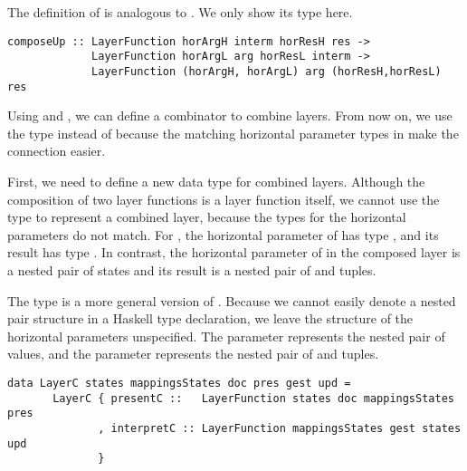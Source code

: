 \documentclass[preprint,natbib]{sigplanconf}
\begin{document}



The definition of  is analogous to . We only show its type here.

\begin{small}
\begin{verbatim}
composeUp :: LayerFunction horArgH interm horResH res ->
             LayerFunction horArgL arg horResL interm ->
             LayerFunction (horArgH, horArgL) arg (horResH,horResL) res
\end{verbatim}
\end{small}


Using  and , we can define a combinator to combine  layers. 
\bc From now on, we use the type  instead of  because the matching horizontal parameter types in  make the connection easier. \ec


First, we need to define a new data type for combined layers. Although the composition of two layer functions is a layer function itself, we cannot use the type  to represent a combined layer, because the types for the horizontal parameters do not match.  For , the horizontal parameter of  has type , and its result has type . In contrast, the horizontal parameter of  in the composed layer is a nested pair of states and its result is a nested pair of  and  tuples. 

The type  is a more general version of . Because we cannot easily denote a nested pair structure in a Haskell type declaration, we leave the structure of the horizontal parameters unspecified. The parameter  represents the nested pair of  values, and the parameter  represents the nested pair of  and  tuples.

\begin{small}
\begin{verbatim}
data LayerC states mappingsStates doc pres gest upd =
       LayerC { presentC ::   LayerFunction states doc mappingsStates pres
              , interpretC :: LayerFunction mappingsStates gest states upd
              }
\end{verbatim}
\end{small}
\end{document}
